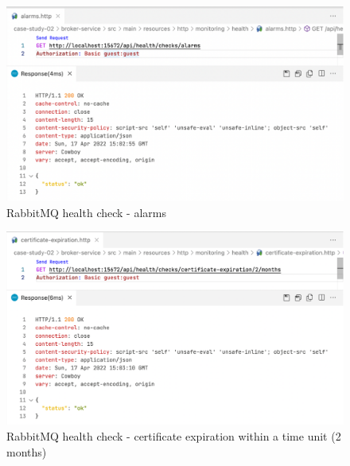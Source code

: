 
\begin{figure}[H]
  \centering
  \includegraphics[width=1.0\linewidth]{./assets/images/case-studies/cs02-hc1.png}
  \caption{RabbitMQ health check - alarms}
  \label{fig:cs02-hc1}
\end{figure}

\begin{figure}[H]
  \centering
  \includegraphics[width=1.0\linewidth]{./assets/images/case-studies/cs02-hc3.png}
  \caption{RabbitMQ health check - certificate expiration within a time unit (2 months)}
  \label{fig:cs02-hc3}
\end{figure}

